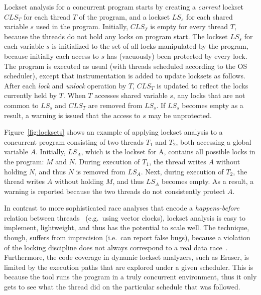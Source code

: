 Lockset analysis for a concurrent program starts by creating a \emph{current} lockset $\mathit{CLS}_T$ for each thread $T$ of the program, and a lockset $\mathit{LS}_s$ for each shared variable $s$ used in the program. Initially, $\mathit{CLS}_T$ is empty for every thread $T$, because the threads do not hold any locks on program start. The lockset $\mathit{LS}_s$ for each variable $s$ is initialized to the set of all locks manipulated by the program, because initially each access to $s$ has (vacuously) been protected by every lock. The program is executed as usual (with threads scheduled according to the OS scheduler), except that instrumentation is added to update locksets as follows.
%
After each \emph{lock} and \emph{unlock} operation by $T$, $\mathit{CLS}_T$ is updated to reflect the locks currently held by $T$.
%
When $T$ accesses shared variable $s$, any locks that are not common to $\mathit{LS}_s$ and $\mathit{CLS}_T$ are removed from $\mathit{LS}_s$.
If $\mathit{LS}_s$ becomes empty as a result, a warning is issued that the access to $s$ may be unprotected.

Figure~\ref{fig:locksets} shows an example of applying lockset analysis to a concurrent program consisting of two threads $T_1$ and $T_2$, both accessing a global variable $A$. Initially, $\mathit{LS}_A$, which is the lockset for A, contains all possible locks in the program: $M$ and $N$. During execution of $T_1$, the thread writes $A$ without holding $N$, and thus $N$ is removed from $\mathit{LS}_A$. Next, during execution of $T_2$, the thread writes $A$ without holding $M$, and thus $\mathit{LS}_A$ becomes empty. As a result, a warning is reported because the two threads do not consistently protect $A$.

In contrast to more sophisticated race analyses that encode a \emph{happens-before} relation between threads~\cite{lamport1978time} (e.g.\ using vector clocks), lockset analysis is easy to implement, lightweight, and thus has the potential to scale well.  The technique, though, suffers from imprecision (i.e.\ can report false bugs), because a violation of the locking discipline does not always correspond to a real data race~\cite{savage1997eraser, pozniansky2003efficient, o2003hybrid, elmas2007goldilocks, flanagan2009fasttrack}. Furthermore, the code coverage in dynamic lockset analyzers, such as Eraser, is limited by the execution paths that are explored under a given scheduler. This is because the tool runs the program in a truly concurrent environment, thus it only gets to see what the thread did on the particular schedule that was followed.

